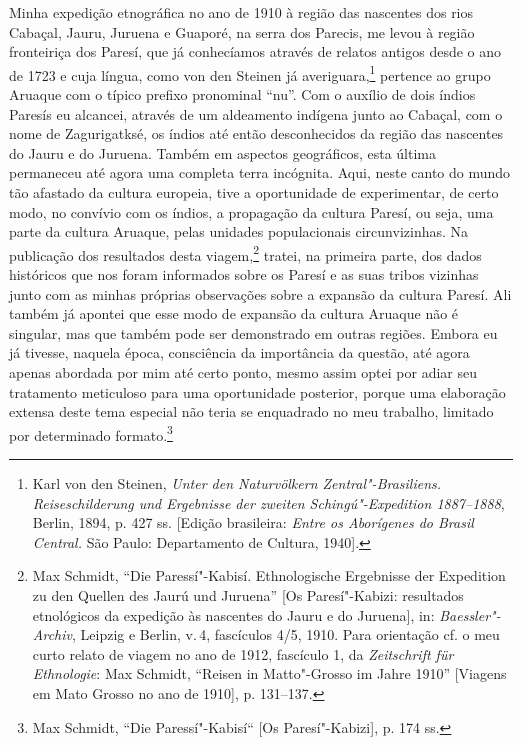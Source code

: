 Minha expedição etnográfica no ano de 1910 à região das nascentes dos
rios Cabaçal, Jauru, Juruena e Guaporé, na serra dos Parecis, me levou à
região fronteiriça dos Paresí, que já conhecíamos através de relatos
antigos desde o ano de 1723 e cuja língua, como von den Steinen já
averiguara,\footnote{Karl von den Steinen, \emph{Unter den Naturvölkern
  Zentral"-Brasiliens. Reiseschilderung und Ergebnisse der zweiten
  Schingú"-Expedition 1887--1888}, Berlin, 1894, p. 427 ss. {[}Edição
  brasileira: \emph{Entre os Aborígenes do Brasil Central.} São Paulo:
  Departamento de Cultura, 1940{]}.} pertence ao grupo Aruaque com o
típico prefixo pronominal ``nu''. Com o auxílio de dois índios Paresís
eu alcancei, através de um aldeamento indígena junto ao Cabaçal, com o
nome de Zagurigatksé, os índios até então desconhecidos da região das
nascentes do Jauru e do Juruena. Também em aspectos geográficos, esta
última permaneceu até agora uma completa terra incógnita. Aqui, neste
canto do mundo tão afastado da cultura europeia, tive a oportunidade de
experimentar, de certo modo, no convívio com os índios, a propagação da
cultura Paresí, ou seja, uma parte da cultura Aruaque, pelas unidades
populacionais circunvizinhas. Na publicação dos resultados desta
viagem,\footnote{Max Schmidt, ``Die Paressí"-Kabisí. Ethnologische
  Ergebnisse der Expedition zu den Quellen des Jaurú und Juruena''
  {[}Os Paresí"-Kabizi: resultados etnológicos da expedição às nascentes
  do Jauru e do Juruena{]}, in: \emph{Baessler"-Archiv}, Leipzig e
  Berlin, v.\,4, fascículos 4/5, 1910. Para orientação cf. o meu curto
  relato de viagem no ano de 1912, fascículo 1, da \emph{Zeitschrift für
  Ethnologie}: Max Schmidt, ``Reisen in Matto"-Grosso im Jahre 1910''
  {[}Viagens em Mato Grosso no ano de 1910{]}, p. 131--137.} tratei, na
primeira parte, dos dados históricos que nos foram informados sobre os
Paresí e as suas tribos vizinhas junto com as minhas próprias
observações sobre a expansão da cultura Paresí. Ali também já apontei
que esse modo de expansão da cultura Aruaque não é singular, mas que
também pode ser demonstrado em outras regiões. Embora eu já tivesse,
naquela época, consciência da importância da questão, até agora apenas
abordada por mim até certo ponto, mesmo assim optei por adiar seu
tratamento meticuloso para uma oportunidade posterior, porque uma
elaboração extensa deste tema especial não teria se enquadrado no meu
trabalho, limitado por determinado formato.\footnote{Max Schmidt, ``Die
  Paressí"-Kabisí`` {[}Os Paresí"-Kabizi{]}, p. 174 ss.}

